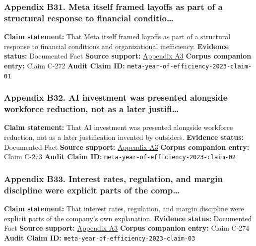\documentclass[
  american,
  11pt,
  letterpaper,
]{article}
\begin{document}
\subsubsection{Appendix B31. Meta itself framed layoffs as part of a
structural response to financial
conditio\ldots{}}\label{ch-05-appendix-b31-meta-itself-framed-layoffs-as-part-of-a-structural-response-to-financial-conditio}

\textbf{Claim statement:} That Meta itself framed layoffs as part of a
structural response to financial conditions and organizational
inefficiency. \textbf{Evidence status:} Documented Fact \textbf{Source
support:}
\hyperref[ch-05-appendix-a3-mark-zuckerberg-s-message-to-meta-employees]{Appendix
A3} \textbf{Corpus companion entry:} Claim C-272 \textbf{Audit Claim
ID:} \texttt{meta-year-of-efficiency-2023-claim-01}

\subsubsection{Appendix B32. AI investment was presented alongside
workforce reduction, not as a later
justifi\ldots{}}\label{ch-05-appendix-b32-ai-investment-was-presented-alongside-workforce-reduction-not-as-a-later-justifi}

\textbf{Claim statement:} That AI investment was presented alongside
workforce reduction, not as a later justification invented by outsiders.
\textbf{Evidence status:} Documented Fact \textbf{Source support:}
\hyperref[ch-05-appendix-a3-mark-zuckerberg-s-message-to-meta-employees]{Appendix
A3} \textbf{Corpus companion entry:} Claim C-273 \textbf{Audit Claim
ID:} \texttt{meta-year-of-efficiency-2023-claim-02}

\subsubsection{Appendix B33. Interest rates, regulation, and margin
discipline were explicit parts of the
comp\ldots{}}\label{ch-05-appendix-b33-interest-rates-regulation-and-margin-discipline-were-explicit-parts-of-the-comp}

\textbf{Claim statement:} That interest rates, regulation, and margin
discipline were explicit parts of the company's own explanation.
\textbf{Evidence status:} Documented Fact \textbf{Source support:}
\hyperref[ch-05-appendix-a3-mark-zuckerberg-s-message-to-meta-employees]{Appendix
A3} \textbf{Corpus companion entry:} Claim C-274 \textbf{Audit Claim
ID:} \texttt{meta-year-of-efficiency-2023-claim-03}
\end{document}
